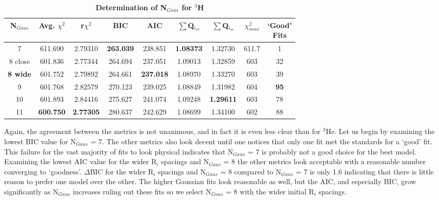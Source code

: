\begin{table}[!h]
\centering
\begin{tabular}{|c c c c c c c c c|}
\hline
\textbf{N$_{Gaus}$} & \textbf{Avg. $\chi^2$} & \textbf{r$\chi^2$} & \textbf{BIC} & \textbf{AIC} & \textbf{$\sum$Q$_{i_{ch}}$} & \textbf{$\sum$Q$_{i_{m}}$} & \textbf{$\chi^2_{max}$} & \makecell{\textbf{`Good'}\\ \textbf{Fits}} \\
\hline
7 & 611.690 & 2.79310 & \textbf{263.039} & 238.851 & \textbf{1.08373} & 1.32730 & 611.7 & 1\\
8 close & 601.836 & 2.77344 & 264.694 & 237.051 & 1.09013 & 1.32859 & 603 & 32\\
\textbf{8 wide} & 601.752 & 2.79892 & 264.661 & \textbf{237.018} & 1.08970 & 1.33270 & 603 & 39\\
9 & 601.768 & 2.82579 & 270.123 & 239.025 & 1.08849 & 1.31982 & 604 & \textbf{95}\\
10 & 601.893 & 2.84416 & 275.627 & 241.074 & 1.09248 & \textbf{1.29611} & 603 & 78\\
11 & \textbf{600.750} & \textbf{2.77305} & 280.637 & 242.629 & 1.08699 & 1.34100 & 602 & 88\\
\hline
\end{tabular}
\caption{\bf{Determination of N$_{Gaus}$ for $^3$H}}
\label{tab:3h_ngaus}
\end{table}

Again, the agreement between the metrics is not unanimous, and in fact it is even less clear than for $^3$He. Let us begin by examining the lowest BIC value for N$_{Gaus}$ = 7. The other metrics also look decent until one notices that only one fit met the standards for a `good' fit. This failure for the vast majority of fits to look physical indicates that N$_{Gaus}$ = 7 is probably not a good choice for the best model. Examining the lowest AIC value for the wider R$_i$ spacings and N$_{Gaus}$ = 8 the other metrics look acceptable with a reasonable number converging to `goodness'. $\Delta$BIC for the wider R$_i$ spacings and N$_{Gaus}$ = 8 compared to N$_{Gaus}$ = 7 is only 1.6 indicating that there is little reason to prefer one model over the other. The higher Gaussian fits look reasonable as well, but the AIC, and especially BIC, grow significantly as N$_{Gaus}$ increases ruling out these fits so we select N$_{Gaus}$ = 8 with the wider initial R$_i$ spacings.

